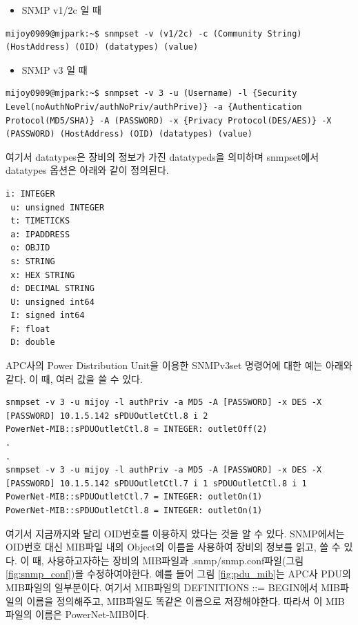 \documentclass[11pt
  , a4paper
  , article
  , oneside
]{memoir}
\begin{document}
\begin{itemize}
\item SNMP v1/2c 일 때
\end{itemize}

\begin{lstlisting}[style=termstyle]
mijoy0909@mjpark:~$ snmpset -v (v1/2c) -c (Community String) (HostAddress) (OID) (datatypes) (value)
\end{lstlisting}

\begin{itemize}
\item SNMP v3 일 때
\end{itemize}

\begin{lstlisting}[style=termstyle]
mijoy0909@mjpark:~$ snmpset -v 3 -u (Username) -l {Security Level(noAuthNoPriv/authNoPriv/authPrive)} -a {Authentication Protocol(MD5/SHA)} -A (PASSWORD) -x {Privacy Protocol(DES/AES)} -X (PASSWORD) (HostAddress) (OID) (datatypes) (value)
\end{lstlisting}

여기서 datatypes은 장비의 정보가 가진 datatypeds을 의미하며 snmpset에서 datatypes 옵션은 아래와 같이 정의된다.

\begin{lstlisting}[style=termstyle]
 i: INTEGER 
 u: unsigned INTEGER 
 t: TIMETICKS
 a: IPADDRESS
 o: OBJID
 s: STRING
 x: HEX STRING
 d: DECIMAL STRING
 U: unsigned int64
 I: signed int64
 F: float
 D: double
\end{lstlisting}

APC사의 Power Distribution Unit을 이용한 SNMPv3set 명령어에 대한 예는 아래와 같다. 이 때, 여러 값을 쓸 수 있다.

\begin{lstlisting}[style=termstyle]
snmpset -v 3 -u mijoy -l authPriv -a MD5 -A [PASSWORD] -x DES -X [PASSWORD] 10.1.5.142 sPDUOutletCtl.8 i 2
PowerNet-MIB::sPDUOutletCtl.8 = INTEGER: outletOff(2)
.
.
snmpset -v 3 -u mijoy -l authPriv -a MD5 -A [PASSWORD] -x DES -X [PASSWORD] 10.1.5.142 sPDUOutletCtl.7 i 1 sPDUOutletCtl.8 i 1
PowerNet-MIB::sPDUOutletCtl.7 = INTEGER: outletOn(1)
PowerNet-MIB::sPDUOutletCtl.8 = INTEGER: outletOn(1)
\end{lstlisting}

여기서 지금까지와 달리 OID번호를 이용하지 았다는 것을 알 수 있다. SNMP에서는 OID번호 대신 MIB파일 내의 Object의 이름을 사용하여 장비의 정보를 읽고, 쓸 수 있다. 이 때, 사용하고자하는 장비의 MIB파일과 .snmp/snmp.conf파일(그림 \ref{fig:snmp_conf})을 수정하여야한다.
예를 들어 그림 \ref{fig:pdu_mib}는 APC사 PDU의 MIB파일의 일부분이다. 여기서 MIB파일의 DEFINITIONS ::= BEGIN에서 MIB파일의 이름을 정의해주고, MIB파일도 똑같은 이름으로 저장해야한다. 따라서 이 MIB파일의 이름은 PowerNet-MIB이다. 
\end{document}
